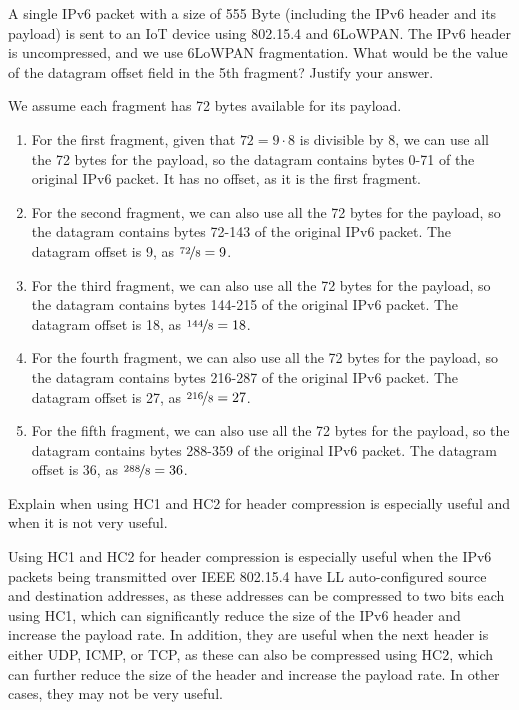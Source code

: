 \begin{ejercicio}
    A single IPv6 packet with a size of 555 Byte (including the IPv6 header and its payload) is sent to an IoT device using 802.15.4 and 6LoWPAN. The IPv6 header is uncompressed, and we use 6LoWPAN fragmentation. What would be the value of the datagram offset field in the 5th fragment? Justify your answer.
    \begin{observacion}
        We assume each fragment has 72 bytes available for its payload.
    \end{observacion}
    \begin{enumerate}
        \item For the first fragment, given that $72=9\cdot 8$ is divisible by 8, we can use all the 72 bytes for the payload, so the datagram contains bytes 0-71 of the original IPv6 packet. It has no offset, as it is the first fragment.
        \item For the second fragment, we can also use all the 72 bytes for the payload, so the datagram contains bytes 72-143 of the original IPv6 packet. The datagram offset is 9, as $\nicefrac{72}{8}=9$.
        \item For the third fragment, we can also use all the 72 bytes for the payload, so the datagram contains bytes 144-215 of the original IPv6 packet. The datagram offset is 18, as $\nicefrac{144}{8}=18$.
        \item For the fourth fragment, we can also use all the 72 bytes for the payload, so the datagram contains bytes 216-287 of the original IPv6 packet. The datagram offset is 27, as $\nicefrac{216}{8}=27$.
        \item For the fifth fragment, we can also use all the 72 bytes for the payload, so the datagram contains bytes 288-359 of the original IPv6 packet. The datagram offset is 36, as $\nicefrac{288}{8}=36$.
    \end{enumerate}
\end{ejercicio}

\begin{ejercicio}
    Explain when using HC1 and HC2 for header compression is especially useful and when it is not very useful.

    Using HC1 and HC2 for header compression is especially useful when the IPv6 packets being transmitted over IEEE 802.15.4 have LL auto-configured source and destination addresses, as these addresses can be compressed to two bits each using HC1, which can significantly reduce the size of the IPv6 header and increase the payload rate. In addition, they are useful when the next header is either UDP, ICMP, or TCP, as these can also be compressed using HC2, which can further reduce the size of the header and increase the payload rate. In other cases, they may not be very useful.
\end{ejercicio}







